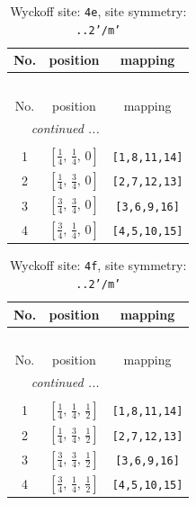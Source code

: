 \documentclass[fleqn,8pt]{jsarticle}
\begin{document}
\begin{longtable}{ccc}
\caption{Wyckoff site: {\tt 4e}, site symmetry: {\tt ..2'/m'}}
 \\
 \hline \hline
No. & position & mapping \\ \hline \endfirsthead

\multicolumn{2}{l}{\tablename\ \thetable{}} \\
 \hline \hline
No. & position & mapping \\ \hline \endhead

 \hline \hline
\multicolumn{2}{r}{\footnotesize\it continued ...} \\ \endfoot

 \hline \hline
\multicolumn{2}{r}{} \\ \endlastfoot

1 & $\left[ \frac{1}{4},\, \frac{1}{4},\, 0 \right]$ & {\tt [1,8,11,14]} \\ \hline
2 & $\left[ \frac{1}{4},\, \frac{3}{4},\, 0 \right]$ & {\tt [2,7,12,13]} \\ \hline
3 & $\left[ \frac{3}{4},\, \frac{3}{4},\, 0 \right]$ & {\tt [3,6,9,16]} \\ \hline
4 & $\left[ \frac{3}{4},\, \frac{1}{4},\, 0 \right]$ & {\tt [4,5,10,15]} \\
\end{longtable}
\renewcommand{\arraystretch}{1.2}
\begin{longtable}{ccc}
\caption{Wyckoff site: {\tt 4f}, site symmetry: {\tt ..2'/m'}}
 \\
 \hline \hline
No. & position & mapping \\ \hline \endfirsthead

\multicolumn{2}{l}{\tablename\ \thetable{}} \\
 \hline \hline
No. & position & mapping \\ \hline \endhead

 \hline \hline
\multicolumn{2}{r}{\footnotesize\it continued ...} \\ \endfoot

 \hline \hline
\multicolumn{2}{r}{} \\ \endlastfoot

1 & $\left[ \frac{1}{4},\, \frac{1}{4},\, \frac{1}{2} \right]$ & {\tt [1,8,11,14]} \\ \hline
2 & $\left[ \frac{1}{4},\, \frac{3}{4},\, \frac{1}{2} \right]$ & {\tt [2,7,12,13]} \\ \hline
3 & $\left[ \frac{3}{4},\, \frac{3}{4},\, \frac{1}{2} \right]$ & {\tt [3,6,9,16]} \\ \hline
4 & $\left[ \frac{3}{4},\, \frac{1}{4},\, \frac{1}{2} \right]$ & {\tt [4,5,10,15]} \\
\end{longtable}
\end{document}
